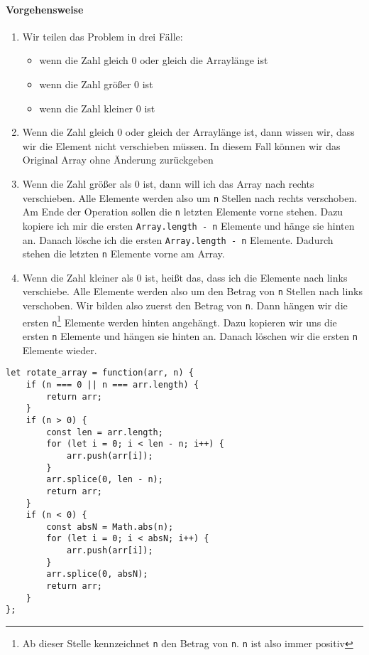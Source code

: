 \documentclass[babel]{book}
\begin{document}
\paragraph{Vorgehensweise}
\begin{enumerate} 
	\item Wir teilen das Problem in drei Fälle: 
	\begin{itemize} 
		\item wenn die Zahl gleich 0 oder gleich die Arraylänge ist
		\item wenn die Zahl größer 0 ist 
		\item wenn die Zahl kleiner 0 ist
	\end{itemize}

	\item Wenn die Zahl gleich 0 oder gleich der Arraylänge ist, dann wissen wir, dass wir die Element nicht verschieben müssen. In diesem Fall können wir das Original Array ohne Änderung zurückgeben

	\item Wenn die Zahl größer als 0 ist, dann will ich das Array nach rechts verschieben. Alle Elemente werden also um \lstinline|n| Stellen nach rechts verschoben. Am Ende der Operation sollen die \lstinline|n| letzten Elemente vorne stehen. Dazu kopiere ich mir die ersten \lstinline|Array.length - n| Elemente und hänge sie hinten an. Danach lösche ich die ersten \lstinline|Array.length - n| Elemente. Dadurch stehen die letzten \lstinline|n| Elemente vorne am Array.
	
	\item Wenn die Zahl kleiner als 0 ist, heißt das, dass ich die Elemente nach links verschiebe. Alle Elemente werden also um den Betrag von \lstinline|n| Stellen nach links verschoben. Wir bilden also zuerst den Betrag von \lstinline|n|. Dann hängen wir die ersten \lstinline|n|\footnote{Ab dieser Stelle kennzeichnet \lstinline|n| den Betrag von \lstinline|n|. \lstinline|n| ist also immer positiv} Elemente werden hinten angehängt. Dazu kopieren wir uns die ersten \lstinline|n| Elemente und hängen sie hinten an. Danach löschen wir die ersten \lstinline|n| Elemente wieder.
\end{enumerate}

\begin{lstlisting}[caption=My Javascript Example]
let rotate_array = function(arr, n) {
	if (n === 0 || n === arr.length) {
		return arr;
	}
	if (n > 0) {
		const len = arr.length;
		for (let i = 0; i < len - n; i++) {
			arr.push(arr[i]);
		}
		arr.splice(0, len - n);
		return arr;    
	}
	if (n < 0) {
		const absN = Math.abs(n);
		for (let i = 0; i < absN; i++) {
			arr.push(arr[i]);
		}
		arr.splice(0, absN);
		return arr;
	}
};
\end{lstlisting}
\end{document}
